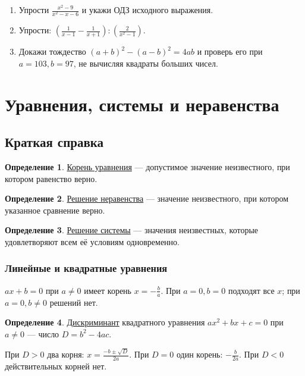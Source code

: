 \documentclass[12pt,a4paper]{article}
\theoremstyle{definition}
\newtheorem{definition}{Определение}[section]
\theoremstyle{plain}
\theoremstyle{remark}
\newcommand{\term}[1]{\uline{#1}}
\newcommand{\starmark}{\ensuremath{{}^{\ast}}}
\begin{document}
\begin{enumerate}[label=\thesection.\arabic*.,leftmargin=2.8em,itemsep=12pt]
\item[\textbf{9.16.}\starmark] Упрости \(\frac{x^{2} - 9}{x^{2} - x - 6}\) и укажи ОДЗ исходного выражения.
\item[\textbf{9.17.}\starmark] Упрости: \((\frac{1}{x - 1} - \frac{1}{x + 1}) : (\frac{2}{x^{2} - 1})\).
\item[\textbf{9.18.}\starmark] Докажи тождество \((a + b)^{2} - (a - b)^{2} = 4 ab\) и проверь его при \(a = 103,\allowbreak b = 97\), не вычисляя квадраты больших чисел.
\end{enumerate}
\clearpage
\section{Уравнения, системы и неравенства}
\subsection*{Краткая справка}
\begin{definition}\term{Корень уравнения} — допустимое значение неизвестного, при котором равенство верно.\end{definition}
\begin{definition}\term{Решение неравенства} — значение неизвестного, при котором указанное сравнение верно.\end{definition}
\begin{definition}\term{Решение системы} — значения неизвестных, которые удовлетворяют всем её условиям одновременно.\end{definition}
\subsubsection*{Линейные и квадратные уравнения}
\(ax + b = 0\) при \(a \ne  0\) имеет корень \(x = - \frac{b}{a}\). При \(a = 0,\allowbreak b = 0\) подходят все \(x\); при \(a = 0,\allowbreak b \ne  0\) решений нет.\par
\begin{definition}\term{Дискриминант} квадратного уравнения \(ax^{2}+bx+c=0\) при \(a\ne0\) — число \(D=b^{2}-4ac\).\end{definition}
При \(D > 0\) два корня: \(x = \frac{- b \pm  \sqrt{D}}{2 a}\). При \(D = 0\) один корень: \(- \frac{b}{2 a}\). При \(D < 0\) действительных корней нет.\par
\end{document}
